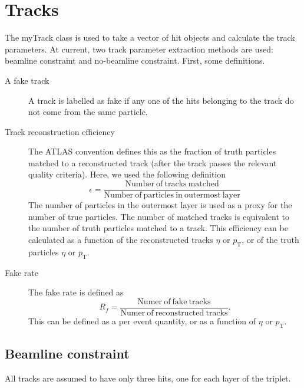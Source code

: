 \documentclass[a4paper, 12pt]{article}
\newcommand{\pt}{\ensuremath{p_{\mathrm{T}}}\xspace}
\begin{document}
\section{Tracks}
The myTrack class is used to take a vector of hit objects and calculate the track parameters. 
At current, two track parameter extraction methods are used: beamline constraint and no-beamline constraint. 
First, some definitions.
\begin{description}
  \item[A fake track]
    A track is labelled as fake if any one of the hits belonging to the track do not come from the same particle.

  \item[Track reconstruction efficiency] 
    The ATLAS convention defines this as the fraction of truth particles matched to a reconstructed track (after the track passes the relevant quality criteria).
    Here, we used the following definition
    \begin{equation}
      \epsilon = \frac{\mathrm{Number~of~tracks~matched}}{\mathrm{Number~of~particles~in~outermost~layer}}
    \end{equation}
    The number of particles in the outermost layer is used as a proxy for the number of true particles. 
    The number of matched tracks is equivalent to the number of truth particles matched to a track. 
    This efficiency can be calculated as a function of the reconstructed tracks $\eta$ or \pt, or of the truth particles $\eta$ or \pt. 

  \item[Fake rate]
    The fake rate is defined as 
    \begin{equation}
      R_f = \frac{\mathrm{Numer~of~fake~tracks}}{\mathrm{Numer~of~reconstructed~tracks}}.
    \end{equation}
    This can be defined as a per event quantity, or as a function of $\eta$ or $\pt$. 

\end{description}

\subsection{Beamline constraint}
All tracks are assumed to have only three hits, one for each layer of the triplet.
\end{document}
